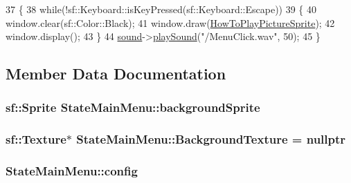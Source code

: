 \begin{DoxyCode}
37 \{
38     \textcolor{keywordflow}{while}(!sf::Keyboard::isKeyPressed(sf::Keyboard::Escape))
39     \{
40         window.clear(sf::Color::Black);
41         window.draw(\hyperlink{classStateMainMenu_a6cc04c69495bf5d7469c21d44e901a67}{HowToPlayPictureSprite});
42         window.display();
43     \}
44     \hyperlink{classStateMainMenu_a6095be3835bac4e3de32ff1700cf8dcd}{sound}->\hyperlink{classSounds_a5a93229c3804b9364b324a4e6245fcbe}{playSound}(\textcolor{stringliteral}{"/MenuClick.wav"}, 50);
45 \}
\end{DoxyCode}


\subsection{Member Data Documentation}
\subsubsection[{\texorpdfstring{background\+Sprite}{backgroundSprite}}]{\setlength{\rightskip}{0pt plus 5cm}sf\+::\+Sprite State\+Main\+Menu\+::background\+Sprite\hspace{0.3cm}{\ttfamily [protected]}}\hypertarget{classStateMainMenu_a9885f1391d304c1567feaa48aee40587}{}\label{classStateMainMenu_a9885f1391d304c1567feaa48aee40587}
\subsubsection[{\texorpdfstring{Background\+Texture}{BackgroundTexture}}]{\setlength{\rightskip}{0pt plus 5cm}sf\+::\+Texture$\ast$ State\+Main\+Menu\+::\+Background\+Texture = nullptr\hspace{0.3cm}{\ttfamily [protected]}}\hypertarget{classStateMainMenu_a2f42ec4ca75ae671b65aa9176d2ff63f}{}\label{classStateMainMenu_a2f42ec4ca75ae671b65aa9176d2ff63f}
\subsubsection[{\texorpdfstring{config}{config}}]{ State\+Main\+Menu\+::config\hspace{0.3cm}{\ttfamily [protected]}}\hypertarget{classStateMainMenu_ac56c2c42cb67e8e173645e2db04a38b8}{}\label{classStateMainMenu_ac56c2c42cb67e8e173645e2db04a38b8}
